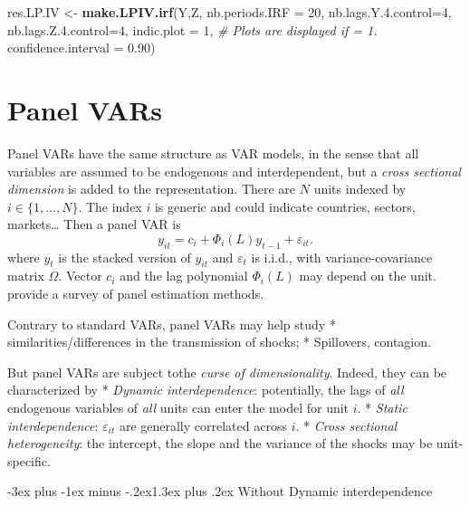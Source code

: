 \documentclass[
  11pt,
]{book}
\makeatletter
\newenvironment{Shaded}{\begin{snugshade}}{\end{snugshade}}
\newcommand{\AttributeTok}[1]{\textcolor[rgb]{0.13,0.29,0.53}{#1}}
\newcommand{\CommentTok}[1]{\textcolor[rgb]{0.56,0.35,0.01}{\textit{#1}}}
\newcommand{\DecValTok}[1]{\textcolor[rgb]{0.00,0.00,0.81}{#1}}
\newcommand{\FloatTok}[1]{\textcolor[rgb]{0.00,0.00,0.81}{#1}}
\newcommand{\FunctionTok}[1]{\textcolor[rgb]{0.13,0.29,0.53}{\textbf{#1}}}
\newcommand{\NormalTok}[1]{#1}
\newcommand{\OtherTok}[1]{\textcolor[rgb]{0.56,0.35,0.01}{#1}}
\renewcommand\section{\@startsection{section}{1}{\z@}
  {-3ex plus -1ex minus -.2ex}{1.3ex plus .2ex}
  {\normalfont\Large\bfseries\color{TextbookInk}}}
\theoremstyle{definition}
\theoremstyle{definition}
\theoremstyle{definition}
\theoremstyle{definition}
\theoremstyle{remark}
\makeatother
\begin{document}
\begin{Shaded}
\begin{Highlighting}[]
\NormalTok{res.LP.IV }\OtherTok{\textless{}{-}} \FunctionTok{make.LPIV.irf}\NormalTok{(Y,Z,}
                           \AttributeTok{nb.periods.IRF =} \DecValTok{20}\NormalTok{,}
                           \AttributeTok{nb.lags.Y.4.control=}\DecValTok{4}\NormalTok{,}
                           \AttributeTok{nb.lags.Z.4.control=}\DecValTok{4}\NormalTok{,}
                           \AttributeTok{indic.plot =} \DecValTok{1}\NormalTok{, }\CommentTok{\# Plots are displayed if = 1.}
                           \AttributeTok{confidence.interval =} \FloatTok{0.90}\NormalTok{)}
\end{Highlighting}
\end{Shaded}

\chapter{Panel VARs}\label{PanelVARs}

Panel VARs have the same structure as VAR models, in the
sense that all variables are assumed to be endogenous and
interdependent, but a \emph{cross sectional dimension} is
added to the representation. There are \(N\) units indexed by
\(i\in\{1,...,N\}\). The index \(i\) is generic and could indicate
countries, sectors, markets\ldots{} Then a panel VAR is
\[ y_{it}=c_i+\Phi_i(L)
y_{t-1}+\varepsilon_{it}.\] where \(y_t\) is the stacked version of
\(y_{it}\) and \(\varepsilon_t\) is i.i.d., with variance-covariance
matrix \(\Omega\). Vector \(c_i\) and the lag polynomial \(\Phi_i(L)\) may depend on the unit. \citet{Canova_Cicarelli_2013} provide a survey of panel estimation methods.

Contrary to standard VARs, panel VARs may help study
* similarities/differences in the transmission of shocks;
* Spillovers, contagion.

But panel VARs are subject tothe \emph{curse of dimensionality}. Indeed, they can be characterized by
* \emph{Dynamic interdependence}: potentially, the lags of \emph{all}
endogenous variables of \emph{all} units can enter the model for unit \(i\).
* \emph{Static interdependence}: \(\varepsilon_{it}\) are
generally correlated across \(i\).
* \emph{Cross sectional heterogeneity}: the intercept, the slope and the
variance of the shocks may be unit-specific.

\section{Without Dynamic interdependence}\label{without-dynamic-interdependence}
\end{document}
